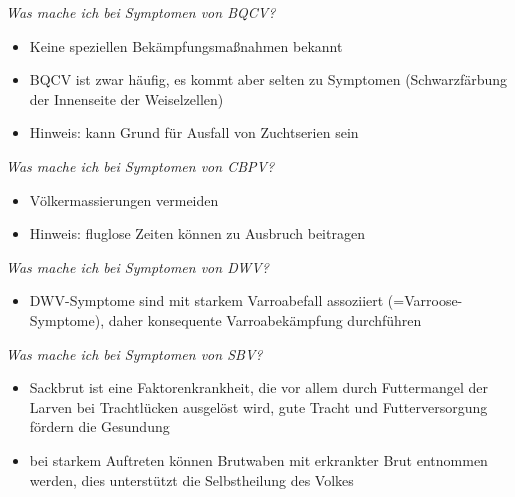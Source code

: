 \textit{Was mache ich bei Symptomen von BQCV?}

\begin{itemize}
    \item Keine speziellen Bekämpfungsmaßnahmen bekannt
    \item BQCV ist zwar häufig, es kommt aber selten zu Symptomen (Schwarzfärbung der Innenseite der Weiselzellen)
    \item Hinweis: kann Grund für Ausfall von Zuchtserien sein
\end{itemize}

\textit{Was mache ich bei Symptomen von CBPV?}

\begin{itemize}
    \item Völkermassierungen vermeiden
    \item Hinweis: fluglose Zeiten können zu Ausbruch beitragen
\end{itemize}

\textit{Was mache ich bei Symptomen von DWV?}

\begin{itemize}
    \item DWV-Symptome sind mit starkem Varroabefall assoziiert (=Varroose-Symptome), daher konsequente Varroabekämpfung durchführen
\end{itemize}

\textit{Was mache ich bei Symptomen von SBV?}

\begin{itemize}
    \item Sackbrut ist eine Faktorenkrankheit, die vor allem durch Futtermangel der Larven bei Trachtlücken ausgelöst wird, gute Tracht und Futterversorgung fördern die Gesundung
    \item bei starkem Auftreten können Brutwaben mit erkrankter Brut entnommen werden, dies unterstützt die Selbstheilung des Volkes
\end{itemize}





